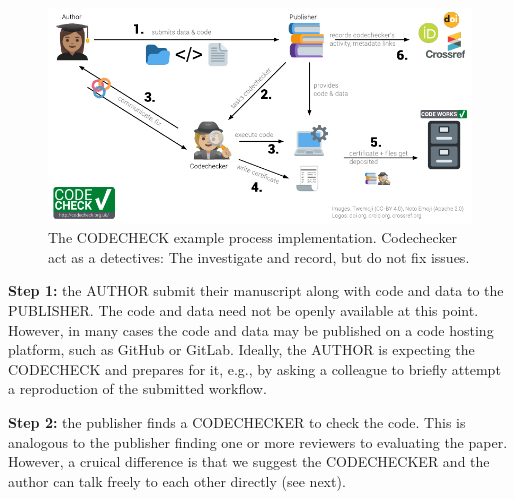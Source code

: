 \documentclass[12pt]{article}
\begin{document}
\begin{figure}
  \centering
      \includegraphics[width=\textwidth]{figs/codecheck_overview.pdf}
  \caption{The CODECHECK example process implementation. Codechecker act as a detectives:
  The investigate and record, but do not fix issues.}
  \label{fig:worfklow}
\end{figure}

\textbf{Step 1:} the AUTHOR submit their manuscript along with code and data to
the PUBLISHER. The code and data need not be openly available at this point.
However, in many cases the code and data may be published on a code hosting platform,
such as GitHub or GitLab. Ideally, the AUTHOR is expecting the CODECHECK and
prepares for it, e.g., by asking a colleague to briefly attempt a reproduction
of the submitted workflow.

\textbf{Step 2:} the publisher finds a CODECHECKER to check the code. This is
analogous to the publisher finding one or more reviewers to evaluating
the paper. However, a cruical difference is that we suggest the CODECHECKER
and the author can talk freely to each other directly (see next).
\end{document}
